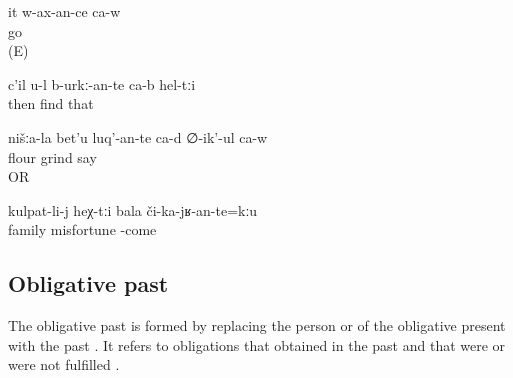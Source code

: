 \begin{exe}
	\ex	\label{ex:He will go / have to go E}
	\gll	it	w-ax-an-ce	ca-w\\
			go	\\
	\glt	{} (E)

	\ex	\label{ex:Then you have to find them analytic}
	\gll	c'il	u-l	b-urkː-an-te	ca-b	hel-tːi\\
		then		find 		that\\
	\glt	{}

	\ex	\label{ex:Our flour we should / (will) grind, he says analytic}
	\gll	nišːa-la	bet'u	luq'-an-te ca-d	∅-ik'-ul	ca-w\\
			flour	grind 		say	\\
	\glt	{} OR 

	\ex	\label{ex:‎To a family such misfortune should not happen analytic}
	\gll	kulpat-li-j	heχ-tːi	bala	či-ka-jʁ-an-te=kːu\\
		family		misfortune	-come\\
	\glt	{}
\end{exe}



\subsection{Obligative past}
\label{ssec:Obligative past}

The obligative past is formed by replacing the person  or  of the obligative present with the past . It refers to obligations that obtained in the past and that were or were not fulfilled .

